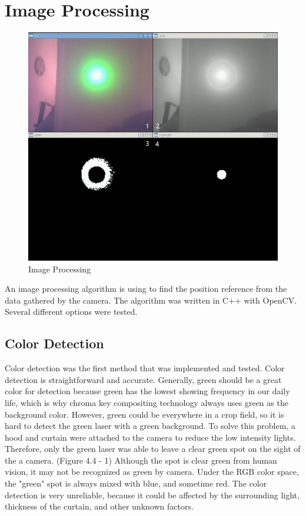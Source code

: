 \documentclass[letterpaper,12pt,oneside]{book}
\begin{document}
		\section{Image Processing}
		\begin{figure}[ht!]
			\begin{center}
				\includegraphics[scale = 0.7]{imaging.jpg}
				\caption{Image Processing}
			\end{center}
		\end{figure}
		An image processing algorithm is using to find the position reference from the data gathered by the camera. The algorithm was written in C++ with OpenCV. Several different options were tested.
		
		\subsection{Color Detection}
		
		Color detection was the first method that was implemented and tested. Color detection is straightforward and accurate. Generally, green should be a great color for detection because green has the lowest showing frequency in our daily life, which is why chroma key compositing technology always uses green as the background color. However, green could be everywhere in a crop field, so it is hard to detect the green laser with a green background. To solve this problem, a hood and curtain were attached to the camera to reduce the low intensity lights. Therefore, only the green laser was able to leave a clear green spot on the sight of the a camera. (Figure 4.4 - 1) Although the spot is clear green from human vision, it may not be recognized as green by camera. Under the RGB color space, the "green" spot is always mixed with blue, and sometime red. The color detection is very unreliable, because it could be affected by the surrounding light, thickness of the curtain, and other unknown factors.
\end{document}
